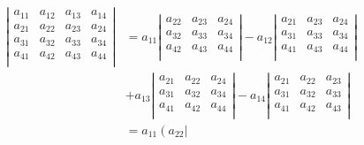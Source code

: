 \documentclass{article}
\begin{document}
\begin{equation}
    \begin{aligned}
        \left|
        \begin{matrix}
            a_{11} & a_{12} & a_{13} & a_{14} \\
            a_{21} & a_{22} & a_{23} & a_{24} \\
            a_{31} & a_{32} & a_{33} & a_{34} \\
            a_{41} & a_{42} & a_{43} & a_{44} \\
        \end{matrix}
        \right|
        & = a_{11}
            \left|
            \begin{matrix}
                a_{22} & a_{23} & a_{24} \\
                a_{32} & a_{33} & a_{34} \\
                a_{42} & a_{43} & a_{44} \\
            \end{matrix}
            \right|
        - a_{12}
            \left|
            \begin{matrix}
                a_{21} & a_{23} & a_{24} \\
                a_{31} & a_{33} & a_{34} \\
                a_{41} & a_{43} & a_{44} \\
            \end{matrix}
            \right|
        \\    
        & + a_{13}
            \left|
            \begin{matrix}
                a_{21} & a_{22} & a_{24} \\
                a_{31} & a_{32} & a_{34} \\
                a_{41} & a_{42} & a_{44} \\
            \end{matrix}
            \right|
        - a_{14}
            \left|
            \begin{matrix}
                a_{21} & a_{22} & a_{23} \\
                a_{31} & a_{32} & a_{33} \\
                a_{41} & a_{42} & a_{43} \\
            \end{matrix}
            \right|
        \\
        & = a_{11}
            \left(
                a_{22}
                \left|
                \begin{matrix}

\end{matrix}
\end{aligned}
\end{equation}
\end{document}
